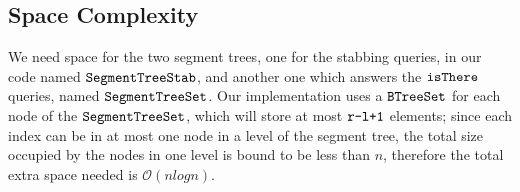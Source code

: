 \documentclass[a4paper,12pt]{article}
\begin{document}
\subsection{Space Complexity}

We need space for the two segment trees, one for the stabbing queries, in our code named $\verb|SegmentTreeStab|$, and another one which answers the $\verb|isThere|$ queries, named $\verb|SegmentTreeSet|$. Our implementation uses a $\verb|BTreeSet|$ for each node of the $\verb|SegmentTreeSet|$, which will store at most $\verb|r-l+1|$ elements; since each index can be in at most one node in a level of the segment tree, the total size occupied by the nodes in one level is bound to be less than $n$, therefore the total extra space needed is $\mathcal{O}(nlogn)$.
\end{document}
